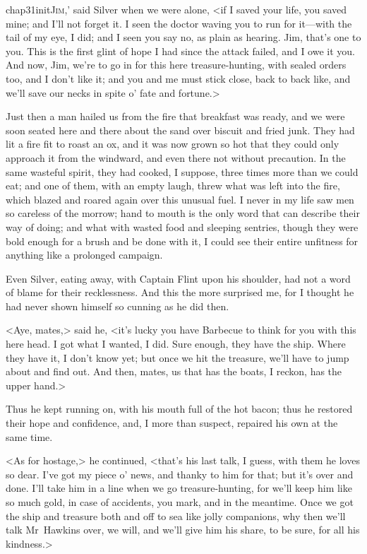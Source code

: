 
\lettrine[ante=`,image=true,findent=2pt]{chap31initJ}{im},' said Silver when we were alone, <if I saved your life, you saved mine; and I'll not forget it. I seen the doctor waving you to run for it—with the tail of my eye, I did; and I seen you say no, as plain as hearing. Jim, that's one to you. This is the first glint of hope I had since the attack failed, and I owe it you. And now, Jim, we're to go in for this here treasure-hunting, with sealed orders too, and I don't like it; and you and me must stick close, back to back like, and we'll save our necks in spite o' fate and fortune.>

Just then a man hailed us from the fire that breakfast was ready, and we were soon seated here and there about the sand over biscuit and fried junk. They had lit a fire fit to roast an ox, and it was now grown so hot that they could only approach it from the windward, and even there not without precaution. In the same wasteful spirit, they had cooked, I suppose, three times more than we could eat; and one of them, with an empty laugh, threw what was left into the fire, which blazed and roared again over this unusual fuel. I never in my life saw men so careless of the morrow; hand to mouth is the only word that can describe their way of doing; and what with wasted food and sleeping sentries, though they were bold enough for a brush and be done with it, I could see their entire unfitness for anything like a prolonged campaign.

Even Silver, eating away, with Captain Flint upon his shoulder, had not a word of blame for their recklessness. And this the more surprised me, for I thought he had never shown himself so cunning as he did then.

<Aye, mates,> said he, <it's lucky you have Barbecue to think for you with this here head. I got what I wanted, I did. Sure enough, they have the ship. Where they have it, I don't know yet; but once we hit the treasure, we'll have to jump about and find out. And then, mates, us that has the boats, I reckon, has the upper hand.>

Thus he kept running on, with his mouth full of the hot bacon; thus he restored their hope and confidence, and, I more than suspect, repaired his own at the same time.

<As for hostage,> he continued, <that's his last talk, I guess, with them he loves so dear. I've got my piece o' news, and thanky to him for that; but it's over and done. I'll take him in a line when we go treasure-hunting, for we'll keep him like so much gold, in case of accidents, you mark, and in the meantime. Once we got the ship and treasure both and off to sea like jolly companions, why then we'll talk Mr~Hawkins over, we will, and we'll give him his share, to be sure, for all his kindness.>

